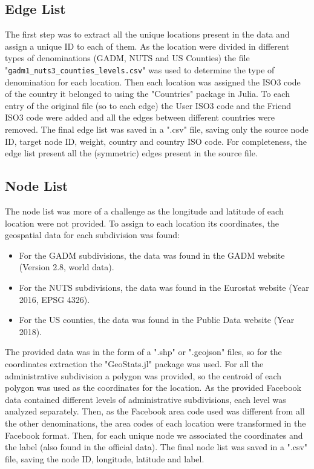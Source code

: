 \subsection{Edge List}
The first step was to extract all the unique locations present in the data and assign a unique ID to each of them. As the location were divided in different types of denominations (GADM\cite{GADM}, NUTS\cite{NUTS} and US Counties) the file "\texttt{gadm1\_nuts3\_counties\_levels.csv}" was used to determine the type of denomination for each location.
Then each location was assigned the ISO3 code of the country it belonged to using the "Countries" package in Julia\cite{countries_package}.
To each entry of the original file (so to each edge) the User ISO3 code and the Friend ISO3 code were added and all the edges between different countries were removed.
The final edge list was saved in a ".csv" file, saving only the source node ID, target node ID, weight, country and country ISO code.
For completeness, the edge list present all the (symmetric) edges present in the source file.

\subsection{Node List}
The node list was more of a challenge as the longitude and latitude of each location were not provided.
To assign to each location its coordinates, the geospatial data for each subdivision was found:
\begin{itemize}
    \item For the GADM subdivisions, the data was found in the GADM website\cite{GADM} (Version 2.8, world data).
    \item For the NUTS subdivisions, the data was found in the Eurostat website\cite{NUTS} (Year 2016, EPSG 4326).
    \item For the US counties, the data was found in the Public Data website\cite{USCounties} (Year 2018).
\end{itemize}
The provided data was in the form of a ".shp" or ".geojson" files, so for the coordinates extraction the "GeoStats.jl" package was used\cite{geostats_package}. For all the administrative subdivision a polygon was provided, so the centroid of each polygon was used as the coordinates for the location. As the provided Facebook data contained different levels of administrative subdivisions, each level was analyzed separately.
Then, as the Facebook area code used was different from all the other denominations, the area codes of each location were transformed in the Facebook format.
Then, for each unique node we associated the coordinates and the label (also found in the official data).
The final node list was saved in a ".csv" file, saving the node ID, longitude, latitude and label.

